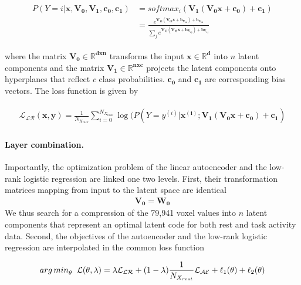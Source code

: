 \documentclass{article} %
\begin{document}
\begin{eqnarray}
  \begin{split}
    P(Y=i|\mathbf{x, V_0,V_1,c_0, c_1}) &= softmax_i(\mathbf{V_1 (V_0 x + c_0) + c_1}) \\
    &= \frac {e^{\mathbf{V_{1i} (V_{0i} x + b_{V_{0i}}) + b_{V_{1i}}}}} {\sum_j e^{\mathbf{V_{1j} (V_{0j} x + b_{V_{0j}}) + b_{V_{1j}}}}}            
  \end{split}
  \label{eq:lr}
\end{eqnarray}

where the matrix $\mathbf{V_0 \in \mathbb{R}^{dxn}}$
transforms the input $\mathbf{x \in \mathbb{R}^{d}}$
into $n$ latent components
and the matrix $\mathbf{V_1 \in \mathbb{R}^{nxc}}$
projects the latent components
onto hyperplanes that reflect $c$ class probabilities.
$\mathbf{c_0}$ and $\mathbf{c_1}$ are corresponding
bias vectors.
The loss function is given by

\begin{eqnarray}
  \begin{split}
    {\mathcal{L_{LR}}}(\mathbf{x, y}) = \frac{1}{N_{X_{task}}} \sum_{i=0}^{N_{X_{task}}} \log(P(Y=y^{(i)}|\mathbf{x^{(i)}; V_1 (V_0 x + c_0) + c_1})
\end{split}
\label{eq:lr_loss}
\end{eqnarray}

\paragraph{Layer combination.}
Importantly, the optimization problem of the linear autoencoder
and the low-rank logistic regression
are linked one two levels. First, their transformation matrices mapping from
input to the latent space are identical
\begin{eqnarray}
  \mathbf{V_0} = \mathbf{W_0}
\end{eqnarray}
We thus search for a compression of the 79,941 voxel values into $n$ latent
components that represent an optimal latent code for both
rest and task activity data.
Second, the objectives of the autoencoder and the low-rank
logistic regression are interpolated in the common loss function

\begin{eqnarray}
  \begin{split}
{arg\,min}_\theta \hspace{0.2cm} {\mathcal{L}}(\theta, \lambda) = \lambda {\mathcal{L_{LR}}}
+ (1-\lambda)\frac{1}{N_{X_{rest}}} {\mathcal{L_{AE}}} + \ell_1(\theta) + \ell_2(\theta)
  \label{eq:loss_equ}
\end{split}
\end{eqnarray}
\end{document}
